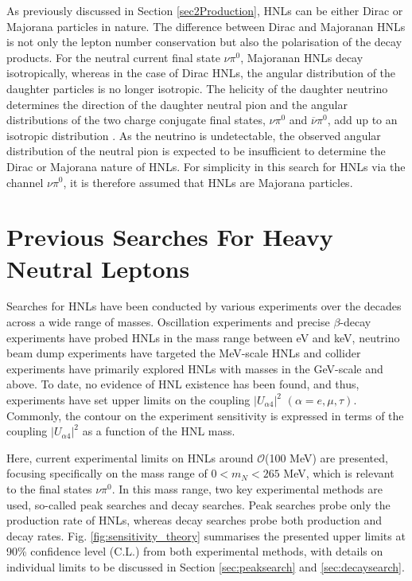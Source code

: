 As previously discussed in Section \ref{sec2Production}, HNLs can be either Dirac or Majorana particles in nature.
The difference between Dirac and Majoranan HNLs is not only the lepton number conservation but also the polarisation of the decay products.
For the neutral current final state $\nu\pi^0$, Majoranan HNLs decay isotropically, whereas in the case of Dirac HNLs, the angular distribution of the daughter particles is no longer isotropic.
The helicity of the daughter neutrino determines the direction of the daughter neutral pion and the angular distributions of the two charge conjugate final states, $\nu\pi^{0}$ and $\overline{\nu}\pi^{0}$, add up to an isotropic distribution  \cite{HNLSilvia}.
As the neutrino is undetectable, the observed angular distribution of the neutral pion is expected to be insufficient to determine the Dirac or Majorana nature of HNLs.
For simplicity in this search for HNLs via the channel $\nu\pi^0$, it is therefore assumed that HNLs are Majorana particles.

\section{Previous Searches For Heavy Neutral Leptons}
\label{sec2Previous}


Searches for HNLs have been conducted by various experiments over the decades across a wide range of masses.
Oscillation experiments and precise $\beta$-decay experiments have probed HNLs in the mass range between eV and keV, neutrino beam dump experiments have targeted the MeV-scale HNLs and collider experiments have primarily explored HNLs with masses in the GeV-scale and above.
To date, no evidence of HNL existence has been found, and thus, experiments have set upper limits on the coupling $|U_{\alpha4}|^{2}$ $(\alpha=e,\mu,\tau)$.
Commonly, the contour on the experiment sensitivity is expressed in terms of the coupling $|U_{\alpha4}|^{2}$ as a function of the HNL mass.

Here, current experimental limits on HNLs around $\mathcal{O}$(100 MeV) are presented, focusing specifically on the mass range of $ 0 < m_{N} < 265 $ MeV, which is relevant to the final states $\nu\pi^{0}$.
In this mass range, two key experimental methods are used, so-called peak searches and decay searches.
Peak searches probe only the production rate of HNLs, whereas decay searches probe both production and decay rates.
Fig. \ref{fig:sensitivity_theory} summarises the presented upper limits at 90\% confidence level (C.L.) from both experimental methods, with details on individual limits to be discussed in Section \ref{sec:peaksearch} and \ref{sec:decaysearch}.

